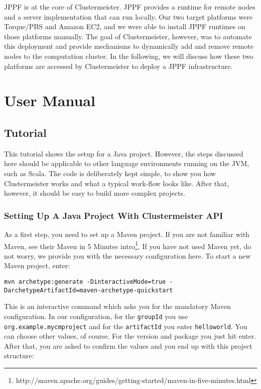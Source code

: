 \documentclass{article}
\begin{document}
JPPF is at the core of Clustermeister. JPPF provides a runtime for remote nodes and a server implementation that can run locally. Our two target platforms were Torque/PBS and Amazon EC2, and we were able to install JPPF runtimes on those platforms manually. The goal of Clustermeister, however, was to automate this deployment and provide mechanisms to dynamically add and remove remote nodes to the computation cluster. In the following, we will discuss how these two platforms are accessed by Clustermeister to deploy a JPPF infrastructure.

\section{User Manual}

\subsection{Tutorial}

\label{tutorial}

This tutorial shows the setup for a Java project. However, the steps discussed here should be applicable to other language environments running on the JVM, such as Scala. The code is deliberately kept simple, to show you how Clustermeister works and what a typical work-flow looks like. After that, however, it should be easy to build more complex projects.

\subsubsection{Setting Up A Java Project With Clustermeister API}

As a first step, you need to set up a Maven project. If you are not familiar with Maven, see their Maven in 5 Minutes intro\footnote{http://maven.apache.org/guides/getting-started/maven-in-five-minutes.html}. 
If you have not used Maven yet, do not worry, we provide you with the necessary configuration here. To start a new Maven project, enter:

\begin{lstlisting}[breaklines=true, backgroundcolor=\color{lbcolor}]
 mvn archetype:generate -DinteractiveMode=true -DarchetypeArtifactId=maven-archetype-quickstart
\end{lstlisting}

This is an interactive command which asks you for the mandatory Maven configuration. In our configuration, for the \texttt{groupId} you use \texttt{org.example.mycmproject} and for the \texttt{artifactId} you enter \texttt{helloworld}. You can choose other values, of course. For the version and package you just hit enter. After that, you are asked to confirm the values and you end up with this project structure:
\end{document}
